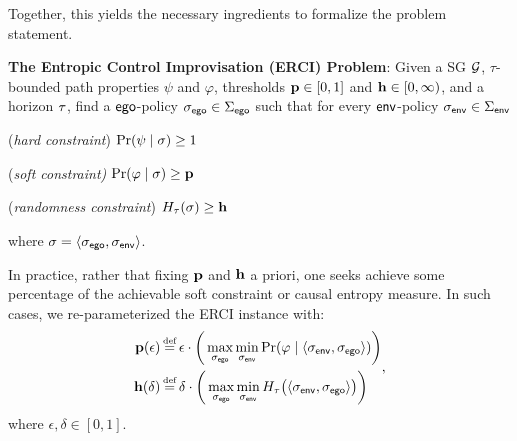 {{{Together, this yields the necessary ingredients to formalize the problem statement. 
\begin{mdframed}[backgroundcolor=blue!5]
\textbf{The Entropic Control Improvisation (ERCI) Problem}:
Given a SG $\mathcal{G}$, $\tau$-bounded path properties $\psi$ and $\varphi$, thresholds $\mathbf{p} \in [0,1]$ and $\mathbf{h} \in [0,\infty)$, and a horizon $\tau$,  find a $\mathsf{ego}$-policy ${\sigma_{\mathsf{ego}}} \in \Sigma_{\mathsf{ego}}$  such that for every $\mathsf{env}$-policy ${\sigma_{\mathsf{env}}} \in \Sigma_{\mathsf{env}}$ \begin{compactenum}
	\item (\emph{hard constraint}) $\Pr(\psi \mid \sigma) \geq 1$
	\item (\emph{soft constraint)} $\Pr(\varphi \mid \sigma) \geq \mathbf{p}$
\item (\emph{randomness constraint}) $H_\tau(\sigma) \geq \mathbf{h}$
\end{compactenum}
where  $\sigma = \langle {\sigma_{\mathsf{ego}}}, {\sigma_{\mathsf{env}}} \rangle$.
\end{mdframed}
\begin{remark}
  In practice, rather that fixing $\mathbf{p}$ and $\mathbf{h}$ a
  priori, one seeks achieve some percentage of the achievable soft
  constraint or causal entropy measure.  In such cases, we
  re-parameterized the ERCI instance with:
  \begin{equation}
    \begin{split}
      \scthreshold(\epsilon) &\eqdef \epsilon \cdot \bigg (\max_{\pOneSched} \min_{\pTwoSched} \Pr(\varphi \mid \langle \pTwoSched, \pOneSched \rangle)\bigg)\\
      \randomness(\delta) &\eqdef  \delta \cdot \bigg(\max_{\pOneSched}
      \min_{\pTwoSched} H_\tau\big (\langle \pTwoSched, \pOneSched
      \rangle \big )\bigg)
    \end{split},
  \end{equation}
  where $\epsilon, \delta \in [0, 1]$.
\end{remark}

\begin{figure}
\centering
\begin{subfigure}{0.2\columnwidth}
\centering
{}
\end{subfigure}
\end{figure}}}}
